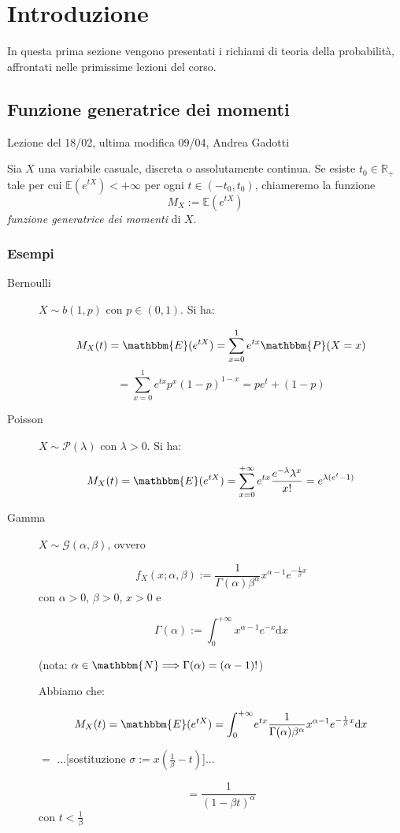 \chapter{Introduzione}
In questa prima sezione vengono presentati i richiami di teoria della probabilità, affrontati nelle primissime lezioni del corso.
\section{Funzione generatrice dei momenti}
Lezione del 18/02, ultima modifica 09/04, Andrea Gadotti

\begin{definizione}[fgm]
Sia \(X\) una variabile casuale, discreta o assolutamente continua.
Se esiste $t_0 \in \mathbb{R}_{+}$ tale per cui \(\mathbb{E}(e^{tX}) < +\infty\) per ogni \(t \in (-t_0 , t_0)\), chiameremo la funzione 
\begin{equation}
  M_X := \mathbb{E}(e^{tX})
\end{equation}
\emph{funzione generatrice dei momenti} di \(X\).
\end{definizione}

\subsection{Esempi}
\begin{description}
\item[Bernoulli] $X \sim b(1,p)$ con $p \in (0,1)$. Si ha:

$$M_X (t) 	= \mathbbm{E}(e^{tX}) 
			= \displaystyle\sum_{x=0}^1 e^{tx} \mathbbm{P}(X=x)$$
$$
			= \displaystyle\sum_{x=0}^1 e^{tx} p^x (1-p)^{1-x}
			= p e^t + (1-p)$$	


\item[Poisson] $X \sim \mathcal{P} (\lambda)$ con $\lambda > 0$. Si ha:

$$M_X (t) 	= \mathbbm{E}(e^{tX}) 
			= \displaystyle\sum_{x=0}^{+\infty} e^{tx} \frac{e^{-\lambda} \lambda^x}{x!}
			= e^{\lambda (e^t -1)}$$
			
			
\item[Gamma] $X \sim \mathcal{G} (\alpha, \beta)$, ovvero 

$$f_X (x; \alpha, \beta) := \frac{1}{\Gamma (\alpha) \beta^{\alpha}} x^{\alpha -1} e^{-\frac{1}{\beta} x}$$ con $\alpha>0$, $\beta>0$, $x>0$ e 

$$\Gamma(\alpha) := \int_0^{+\infty} \! x^{\alpha -1} e^{-x} \mathrm{d}x$$ 

(nota: $\alpha \in \mathbbm{N} \Longrightarrow \Gamma(\alpha)=(\alpha - 1)!$)

Abbiamo che: 

$$M_X (t)	= \mathbbm{E}(e^{tX})
			= \int_0^{+\infty} \! e^{tx} \frac{1}{\Gamma (\alpha) \beta^{\alpha}} x^{\alpha -1} e^{-\frac{1}{\beta} x} \mathrm{d}x$$
\begin{center} $=$ ...[sostituzione $\sigma := x(\frac{1}{\beta} - t)$]...  \end{center}
			$$= \frac{1}{(1-\beta t)^{\alpha}}$$ con $t < \frac{1}{\beta}$
			
\end{description}

